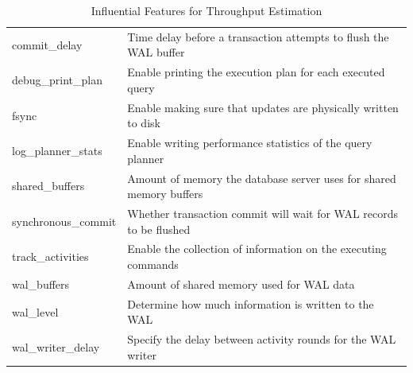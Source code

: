 \begin{table}[t]
\begin{adjustbox}{max width=\textwidth}
\begin{tabular}{ll}
      commit\_delay                  & Time delay before a transaction attempts to flush the WAL buffer    \\
      debug\_print\_plan             & Enable printing the execution plan for each executed query          \\
      fsync                          & Enable making sure that updates are physically written to disk      \\
      log\_planner\_stats            & Enable writing performance statistics of the query planner          \\
      shared\_buffers                & Amount of memory the database server uses for shared memory buffers \\
      synchronous\_commit            & Whether transaction commit will wait for WAL records to be flushed  \\
      track\_activities              & Enable the collection of information on the executing commands      \\
      wal\_buffers                   & Amount of shared memory used for WAL data                           \\
      wal\_level                     & Determine how much information is written to the WAL                \\
      wal\_writer\_delay             & Specify the delay between activity rounds for the WAL writer        \\
      \bottomrule
    \end{tabular}
  \end{adjustbox}

  \caption{Influential Features for Throughput Estimation}
  \label{tab:influential_features_for_throughput}
\end{table}

